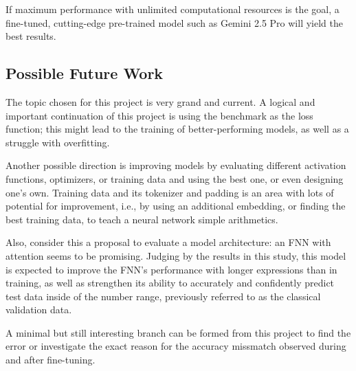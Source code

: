 \documentclass{article}
\begin{document}
If maximum performance with unlimited computational resources is the goal, a fine-tuned, cutting-edge pre-trained model such as Gemini 2.5 Pro will yield the best results.

\subsection{Possible Future Work}
The topic chosen for this project is very grand and current. A logical and important continuation of this project is using the benchmark as the loss function; this might lead to the training of better-performing models, as well as a struggle with overfitting. 

Another possible direction is improving models by evaluating different activation functions, optimizers, or training data and using the best one, or even designing one's own. Training data and its tokenizer and padding is an area with lots of potential for improvement, i.e., by using an additional embedding, or finding the best training data, to teach a neural network simple arithmetics. 

Also, consider this a proposal to evaluate a model architecture: an FNN with attention seems to be promising. Judging by the results in this study, this model is expected to improve the FNN's performance with longer expressions than in training, as well as strengthen its ability to accurately and confidently predict test data inside of the number range, previously referred to as the classical validation data.

A minimal but still interesting branch can be formed from this project to find the error or investigate the exact reason for the accuracy missmatch observed during and after fine-tuning.

\newpage
\printbibliography[heading=bibintoc]
\end{document}
